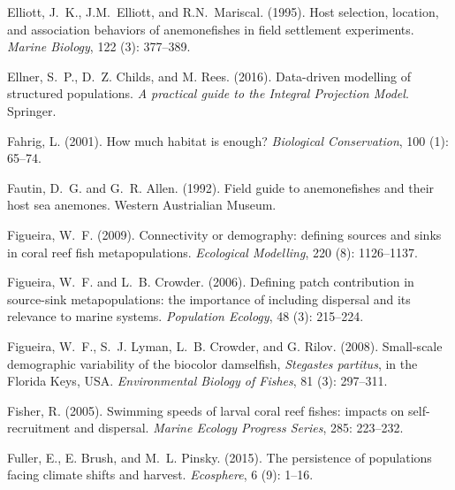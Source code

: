\documentclass[12pt, oneside]{article}   	%
\begin{document}
\begin{thebibliography}{66}
Elliott, J.~K., J.M.~Elliott, and R.N.~Mariscal. (1995).
\newblock Host selection, location, and association behaviors of anemonefishes
  in field settlement experiments.
\newblock \emph{Marine Biology}, 122 (3): 377--389.

Ellner, S.~P., D.~Z. Childs, and M. Rees. (2016).
\newblock Data-driven modelling of structured populations.
\newblock \emph{A practical guide to the Integral Projection Model}. Springer.

Fahrig, L. (2001).
\newblock How much habitat is enough?
\newblock \emph{Biological Conservation}, 100 (1): 65--74.

Fautin, D.~G. and G.~R. Allen. (1992).
\newblock Field guide to anemonefishes and their host sea anemones.
\newblock Western Austrialian Museum.

Figueira, W.~F. (2009).
\newblock Connectivity or demography: defining sources and sinks in coral reef
  fish metapopulations.
\newblock \emph{Ecological Modelling}, 220 (8): 1126--1137.

Figueira, W.~F. and L.~B. Crowder. (2006).
\newblock Defining patch contribution in source-sink metapopulations: the
  importance of including dispersal and its relevance to marine systems.
\newblock \emph{Population Ecology}, 48 (3): 215--224.

Figueira, W.~F., S.~J. Lyman, L.~B. Crowder, and G. Rilov. (2008).
\newblock Small-scale demographic variability of the biocolor damselfish,
  \textit{Stegastes partitus}, in the Florida Keys, USA.
\newblock \emph{Environmental Biology of Fishes}, 81 (3):
  297--311.

Fisher, R. (2005).
\newblock Swimming speeds of larval coral reef fishes: impacts on
  self-recruitment and dispersal.
\newblock \emph{Marine Ecology Progress Series}, 285: 223--232.

Fuller, E., E. Brush, and M.~L. Pinsky. (2015).
\newblock The persistence of populations facing climate shifts and harvest.
\newblock \emph{Ecosphere}, 6 (9): 1--16.


\end{thebibliography}
\end{document}
